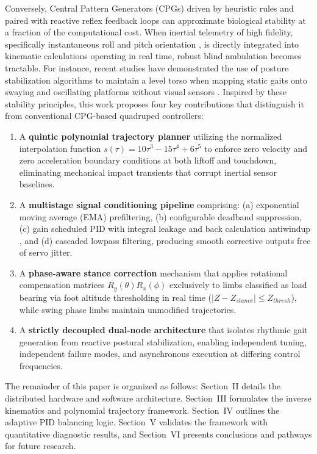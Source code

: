 Conversely, Central Pattern Generators (CPGs) driven by heuristic
rules and paired with reactive reflex feedback loops can approximate
biological stability at a fraction of the computational cost. When inertial telemetry of high fidelity,
specifically instantaneous roll and pitch orientation
\cite{madgwick2011estimation}, is directly integrated into kinematic
calculations operating in real time, robust blind ambulation
becomes tractable. For instance, recent studies have demonstrated the use of posture stabilization algorithms to maintain a level torso when mapping static gaits onto swaying and oscillating platforms without visual sensors \cite{li2022posture}. Inspired by these stability principles, this work proposes four key contributions that distinguish it from
conventional CPG-based quadruped controllers:
\begin{enumerate}
    \item A \textbf{quintic polynomial trajectory planner}
    utilizing the normalized interpolation function
    $s(\tau)=10\tau^3-15\tau^4+6\tau^5$ to enforce zero velocity
    and zero acceleration boundary conditions at both liftoff and
    touchdown, eliminating mechanical impact transients that
    corrupt inertial sensor baselines.

    \item A \textbf{multistage signal conditioning pipeline}
    comprising: (a) exponential moving average (EMA) prefiltering, (b) configurable deadband suppression,
    (c) gain scheduled PID with integral leakage and back calculation
    antiwindup \cite{astrom2006advanced}, and
    (d) cascaded lowpass filtering, producing smooth
    corrective outputs free of servo jitter.

    \item A \textbf{phase-aware stance correction} mechanism that
    applies rotational compensation matrices
    $R_y(\theta)R_x(\phi)$ exclusively to limbs classified as
    load bearing via foot altitude thresholding in real time
    ($|Z - Z_{stance}| \leq Z_{thresh}$), while swing phase limbs
    maintain unmodified trajectories.

    \item A \textbf{strictly decoupled dual-node architecture} that
    isolates rhythmic gait generation from reactive postural
    stabilization, enabling independent tuning, independent
    failure modes, and asynchronous execution at differing
    control frequencies.
\end{enumerate}

The remainder of this paper is organized as follows: Section~II details the distributed hardware and software architecture. Section~III formulates the inverse kinematics and polynomial trajectory framework. Section~IV outlines the adaptive PID balancing logic. Section~V validates the framework with quantitative diagnostic results, and Section~VI presents conclusions and pathways for future research.

